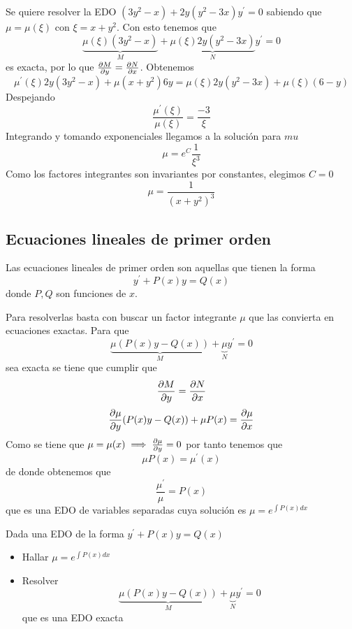 \documentclass{mathnotes}
\begin{document}
\begin{example}
Se quiere resolver la EDO $(3y^2-x)+2y(y^2-3x)y^\prime = 0$ sabiendo que $\mu = \mu(\xi)$ con $\xi = x+y^2$. Con esto tenemos que $$\underbrace{\mu(\xi)(3y^2-x)}_M+\underbrace{\mu(\xi)2y(y^2-3x)}_Ny^\prime = 0$$ es exacta, por lo que $\partialder{y}{M} = \partialder{x}{N}$. 
Obtenemos $$\mu^\prime(\xi)2y(3y^2-x)+\mu(x+y^2)6y = \mu(\xi)2y(y^2-3x)+\mu(\xi)(6-y)$$
Despejando $$\frac{\mu^\prime(\xi)}{\mu(\xi)} = \frac{-3}{\xi}$$
Integrando y tomando exponenciales llegamos a la solución para $mu$ $$\mu = e^C\frac{1}{\xi^3}$$
Como los factores integrantes son invariantes por constantes, elegimos $C=0$ $$\mu = \frac{1}{(x+y^2)^3}$$
\end{example}

\subsection{Ecuaciones lineales de primer orden}
Las ecuaciones lineales de primer orden son aquellas que tienen la forma $$y^\prime +P(x)y=Q(x)$$ donde $P,Q$ son funciones de $x$.

Para resolverlas basta con buscar un factor integrante $\mu$ que las convierta en ecuaciones exactas.
Para que 
$$\underbrace{\mu(P(x)y-Q(x))}_M+\underbrace{\mu}_N y^\prime = 0$$
sea exacta se tiene que cumplir que $$\partialder{y}{M} = \partialder{x}{N}$$
$$\partialder{y}{\mu}(P(x)y-Q(x)) + \mu P(x) = \partialder{x}{\mu}$$
Como se tiene que $\mu = \mu(x) \implies \partialder{y}{\mu} = 0$ por tanto tenemos que $$\mu P(x) = \mu^\prime(x)$$ de donde obtenemos que $$\frac{\mu^\prime}{\mu} = P(x)$$ que es una EDO de variables separadas cuya solución es $\mu = e^{\int P(x)dx}$

\begin{method}
Dada una EDO de la forma $y^\prime +P(x)y = Q(x)$
\begin{itemize}
\item Hallar $\mu = e^{\int P(x)dx}$
\item Resolver $$\underbrace{\mu(P(x)y-Q(x))}_M+\underbrace{\mu}_N y^\prime = 0$$ que es una EDO exacta
\end{itemize}
\end{method}
\end{document}
